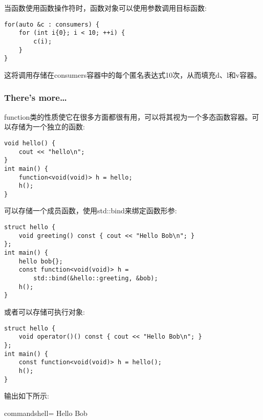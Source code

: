 当函数使用函数操作符时，函数对象可以使用参数调用目标函数:

\begin{lstlisting}[style=styleCXX]
for(auto &c : consumers) {
	for (int i{0}; i < 10; ++i) {
		c(i);
	}
}
\end{lstlisting}

这将调用存储在consumers容器中的每个匿名表达式10次，从而填充d、l和v容器。

\subsubsection{There's more…}

function类的性质使它在很多方面都很有用，可以将其视为一个多态函数容器。可以存储为一个独立的函数:

\begin{lstlisting}[style=styleCXX]
void hello() {
	cout << "hello\n";
}
int main() {
	function<void(void)> h = hello;
	h();
}
\end{lstlisting}

可以存储一个成员函数，使用std::bind来绑定函数形参:

\begin{lstlisting}[style=styleCXX]
struct hello {
	void greeting() const { cout << "Hello Bob\n"; }
};
int main() {
	hello bob{};
	const function<void(void)> h =
		std::bind(&hello::greeting, &bob);
	h();
}
\end{lstlisting}

或者可以存储可执行对象:

\begin{lstlisting}[style=styleCXX]
struct hello {
	void operator()() const { cout << "Hello Bob\n"; }
};
int main() {
	const function<void(void)> h = hello();
	h();
}
\end{lstlisting}

输出如下所示:

\begin{tcblisting}{commandshell={}}
Hello Bob
\end{tcblisting}












